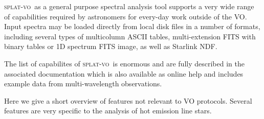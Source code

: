 \documentclass[final,authoryear,5p,times,twocolumn]{elsarticle}
\newcommand{\splatvo}{\textsc{splat-vo}}
\begin{document}
\splatvo\ as a general purpose spectral analysis tool supports a very wide
range of capabilities required by astronomers for every-day work outside of
the VO. Input spectra may be loaded directly from local disk files in a number
of formats, including several types of multicolumn ASCII tables,
multi-extension FITS with binary tables or 1D spectrum FITS image, as well as
Starlink NDF.

The list of capabilites of \splatvo\ is enormous and are fully described in
the associated documentation \citep[SUN/243;][]{sun243} which is also
available as online help and includes example data from
multi-wavelength observations.

Here we give a short overview of features not relevant to VO protocols.
Several features are very specific to the analysis of hot emission
line stars.
\end{document}

